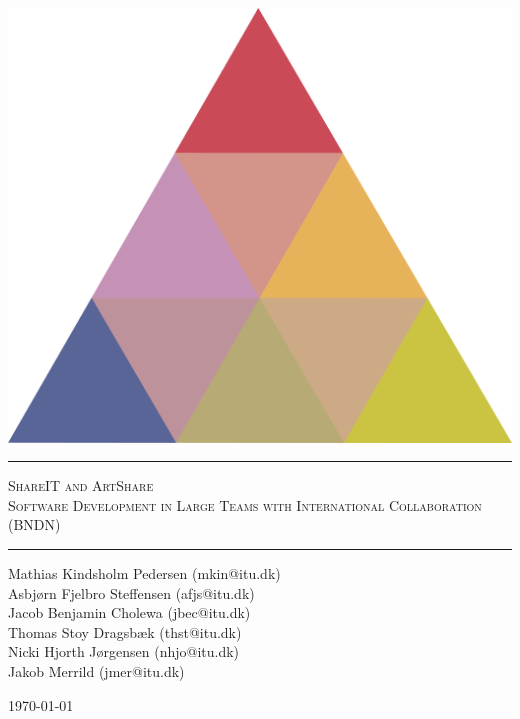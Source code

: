 \begin{titlepage}
\begin{center}

\vspace{2cm}

\includegraphics[scale=0.5]{./img/logo.png}

\rule{\linewidth}{0.6mm}

\textsc{\LARGE ShareIT and ArtShare} \\
\textsc{Software Development in Large Teams with International Collaboration (BNDN)}
\vspace{0.2cm}
\rule{\linewidth}{0.4mm}

Mathias Kindsholm Pedersen (mkin@itu.dk) \\ Asbj\o rn Fjelbro Steffensen (afjs@itu.dk)\\ Jacob Benjamin Cholewa (jbec@itu.dk) \\Thomas Stoy Dragsb\ae k (thst@itu.dk)\\ Nicki Hjorth J\o rgensen (nhjo@itu.dk)\\  Jakob Merrild (jmer@itu.dk)\\ 

\vfill

\large \today
\end{center}


\end{titlepage}